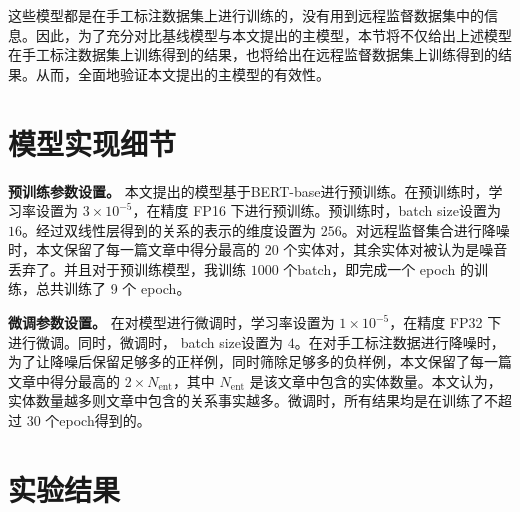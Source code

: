 这些模型都是在手工标注数据集上进行训练的，没有用到远程监督数据集中的信息。因此，为了充分对比基线模型与本文提出的主模型，本节将不仅给出上述模型在手工标注数据集上训练得到的结果，也将给出在远程监督数据集上训练得到的结果。从而，全面地验证本文提出的主模型的有效性。


\section{模型实现细节}

\smallskip
\noindent
\textbf{预训练参数设置。} 本文提出的模型基于BERT-base进行预训练。在预训练时，学习率设置为 $3 \times 10^{-5}$，在精度 FP16 下进行预训练。预训练时，batch size设置为 $16$。经过双线性层得到的关系的表示的维度设置为 $256$。对远程监督集合进行降噪时，本文保留了每一篇文章中得分最高的 $20$ 个实体对，其余实体对被认为是噪音丢弃了。并且对于预训练模型，我训练 $1000$ 个batch，即完成一个 epoch 的训练，总共训练了 9 个 epoch。

\smallskip
\noindent
\textbf{微调参数设置。} 在对模型进行微调时，学习率设置为 $1 \times 10^{-5}$，在精度 FP32 下进行微调。同时，微调时， batch size设置为 $4$。在对手工标注数据进行降噪时，为了让降噪后保留足够多的正样例，同时筛除足够多的负样例，本文保留了每一篇文章中得分最高的 $2 \times N_{\text{ent}}$，其中 $N_{\text{ent}}$ 是该文章中包含的实体数量。本文认为，实体数量越多则文章中包含的关系事实越多。微调时，所有结果均是在训练了不超过 $30$ 个epoch得到的。

\section{实验结果}

